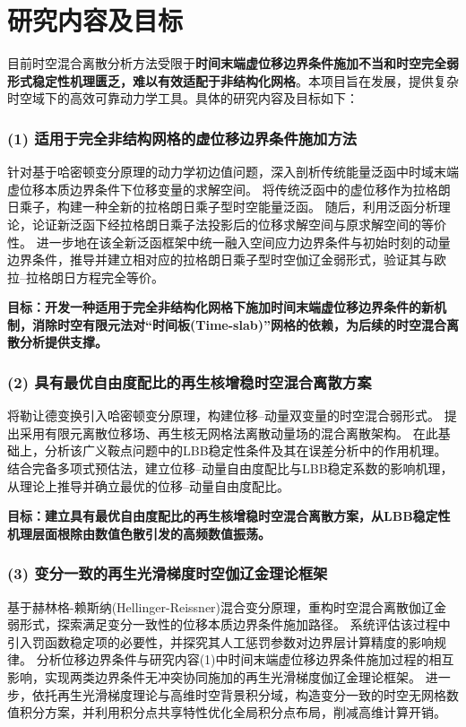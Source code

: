 
\section{\bfseries 研究内容及目标}

目前时空混合离散分析方法受限于\textbf{时间末端虚位移边界条件施加不当和时空完全弱形式稳定性机理匮乏，难以有效适配于非结构化网格}。本项目旨在发展\textbf{\titlecn}，提供复杂时空域下的高效可靠动力学工具。具体的研究内容及目标如下：

\subsubsection*{\bfseries (1) 适用于完全非结构网格的虚位移边界条件施加方法}
针对基于哈密顿变分原理的动力学初边值问题，深入剖析传统能量泛函中时域末端虚位移本质边界条件下位移变量的求解空间。
将传统泛函中的虚位移作为拉格朗日乘子，构建一种全新的拉格朗日乘子型时空能量泛函。
随后，利用泛函分析理论，论证新泛函下经拉格朗日乘子法投影后的位移求解空间与原求解空间的等价性。
进一步地在该全新泛函框架中统一融入空间应力边界条件与初始时刻的动量边界条件，推导并建立相对应的拉格朗日乘子型时空伽辽金弱形式，验证其与欧拉--拉格朗日方程完全等价。

\textbf{ 目标：开发一种适用于完全非结构化网格下施加时间末端虚位移边界条件的新机制，消除时空有限元法对“时间板(Time-slab)”网格的依赖，为后续的时空混合离散分析提供支撑。 }

\subsubsection*{\bfseries (2) 具有最优自由度配比的再生核增稳时空混合离散方案}

将勒让德变换引入哈密顿变分原理，构建位移--动量双变量的时空混合弱形式。
提出采用有限元离散位移场、再生核无网格法离散动量场的混合离散架构。
在此基础上，分析该广义鞍点问题中的LBB稳定性条件及其在误差分析中的作用机理。
结合完备多项式预估法，建立位移--动量自由度配比与LBB稳定系数的影响机理，从理论上推导并确立最优的位移--动量自由度配比。

\textbf{ 目标：建立具有最优自由度配比的再生核增稳时空混合离散方案，从LBB稳定性机理层面根除由数值色散引发的高频数值振荡。 }
\newpage 

\subsubsection*{\bfseries (3) 变分一致的再生光滑梯度时空伽辽金理论框架}

基于赫林格-赖斯纳(Hellinger-Reissner)混合变分原理，重构时空混合离散伽辽金弱形式，探索满足变分一致性的位移本质边界条件施加路径。
系统评估该过程中引入罚函数稳定项的必要性，并探究其人工惩罚参数对边界层计算精度的影响规律。
分析位移边界条件与研究内容(1)中时间末端虚位移边界条件施加过程的相互影响，实现两类边界条件无冲突协同施加的再生光滑梯度伽辽金理论框架。
进一步，依托再生光滑梯度理论与高维时空背景积分域，构造变分一致的时空无网格数值积分方案，并利用积分点共享特性优化全局积分点布局，削减高维计算开销。

